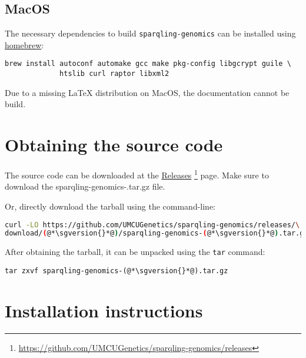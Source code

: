 \subsection{MacOS}

  The necessary dependencies to build \texttt{sparqling-genomics} can be
  installed using \href{https://brew.sh/}{homebrew}:

\begin{siderules}
\begin{verbatim}
brew install autoconf automake gcc make pkg-config libgcrypt guile \
             htslib curl raptor libxml2
\end{verbatim}
\end{siderules}

  Due to a missing \LaTeX{} distribution on MacOS, the documentation
  cannot be build.

\section{Obtaining the source code}
\label{sec:obtaining-tarball}

  \begin{sloppypar}
  The source code can be downloaded at the
  \href{https://github.com/UMCUGenetics/sparqling-genomics/releases}%
  {Releases}%
  \footnote{\url{https://github.com/UMCUGenetics/sparqling-genomics/releases}}
  page.  Make sure to download the {\fontfamily{\ttdefault}\selectfont
    sparqling-genomics-\sgversion{}.tar.gz} file.
  \end{sloppypar}

  Or, directly download the tarball using the command-line:
\begin{siderules}
\begin{lstlisting}[language=bash]
curl -LO https://github.com/UMCUGenetics/sparqling-genomics/releases/\
download/(@*\sgversion{}*@)/sparqling-genomics-(@*\sgversion{}*@).tar.gz
\end{lstlisting}
\end{siderules}

  After obtaining the tarball, it can be unpacked using the \texttt{tar}
  command:

\begin{siderules}
\begin{lstlisting}
tar zxvf sparqling-genomics-(@*\sgversion{}*@).tar.gz
\end{lstlisting}
\end{siderules}

\section{Installation instructions}

